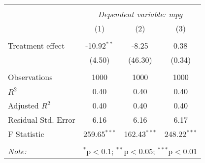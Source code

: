 \begin{tabular}{@{\extracolsep{5pt}}lccc}
\\[-1.8ex]\hline
\hline \\[-1.8ex]
& \multicolumn{3}{c}{\textit{Dependent variable: mpg}} \
\cr \cline{2-4}
\\[-1.8ex] & (1) & (2) & (3) \\
\hline \\[-1.8ex]
  Treatment effect & -10.92$^{**}$ & -8.25$^{}$ & 0.38$^{}$ \\
& (4.50) & (46.30) & (0.34) \\
\hline \\[-1.8ex]
 Observations & 1000 & 1000 & 1000 \\
 $R^2$ & 0.40 & 0.40 & 0.40 \\
 Adjusted $R^2$ & 0.40 & 0.40 & 0.40 \\
 Residual Std. Error & 6.16 & 6.16 & 6.17 \\
 F Statistic & 259.65$^{***}$ & 162.43$^{***}$ & 248.22$^{***}$ \\
\hline
\hline \\[-1.8ex]
\textit{Note:} & \multicolumn{3}{r}{$^{*}$p$<$0.1; $^{**}$p$<$0.05; $^{***}$p$<$0.01} \\
\end{tabular}